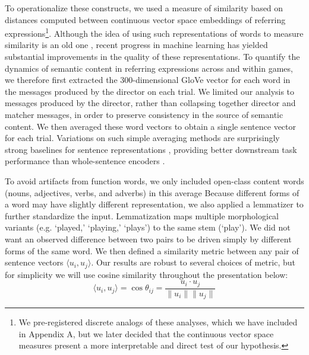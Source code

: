 \documentclass[alpha-refs]{wiley-article}
\begin{document}
To operationalize these constructs, we used a measure of similarity based on distances computed between continuous vector space embeddings of referring expressions\footnote{We pre-registered discrete analogs of these analyses, which we have included in Appendix A, but we later decided that the continuous vector space measures present a more interpretable and direct test of our hypothesis.}.
Although the idea of using such representations of words to measure similarity is an old one \citep{osgood1952nature,landauer_solution_1997,bengio_neural_2003}, recent progress in machine learning has yielded substantial improvements in the quality of these representations.
To quantify the dynamics of semantic content in referring expressions across and within games, we therefore first extracted the 300-dimensional GloVe vector \citep{pennington2014glove} for each word in the messages produced by the director on each trial.
We limited our analysis to messages produced by the director, rather than collapsing together director and matcher messages, in order to preserve consistency in the source of semantic content.
We then averaged these word vectors to obtain a single sentence vector for each trial.
Variations on such simple averaging methods are surprisingly strong baselines for sentence representations \citep{arora2017asimple}, providing better downstream task performance than whole-sentence encoders \citep{KirosEtAl15_SkipThought}.

To avoid artifacts from function words, we only included open-class content words (nouns, adjectives, verbs, and adverbs) in this average
Because different forms of a word may have slightly different representation, we also applied a lemmatizer to further standardize the input. Lemmatization maps multiple morphological variants (e.g. `played,' `playing,' `plays') to the same stem (`play'). 
We did not want an observed difference between two pairs to be driven simply by different forms of the same word.
We then defined a similarity metric between any pair of sentence vectors $\langle u_i, u_j \rangle$.
Our results are robust to several choices of metric, but for simplicity we will use cosine similarity throughout the presentation below: $$\langle u_i, u_j \rangle = \cos \theta_{ij} = \frac{u_i \cdot u_j}{\| u_i\| \| u_j \|}$$
\end{document}
